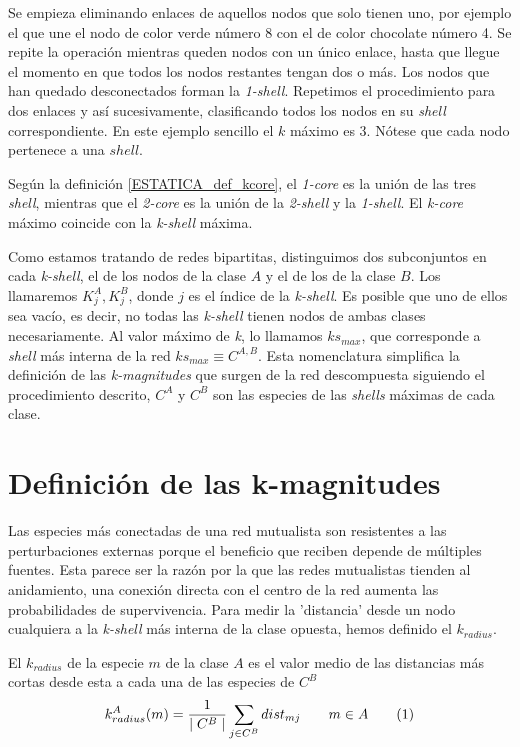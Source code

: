 Se empieza eliminando enlaces de aquellos nodos que solo tienen uno, por ejemplo el que une el nodo de color verde número 8 con el de color chocolate número 4. Se repite la operación mientras queden nodos con un único enlace, hasta que llegue el momento en que todos los nodos restantes tengan dos o más. Los nodos que han quedado desconectados forman la \textit{1-shell}. Repetimos el procedimiento para dos enlaces y así sucesivamente, clasificando todos los nodos en su \textit{shell} correspondiente. En este ejemplo sencillo el $k$ máximo es 3. Nótese que cada nodo pertenece a una $shell$.


Según la definición \ref{ESTATICA_def_kcore}, el  \textit{1-core} es la unión de las tres \textit{shell}, mientras que el \textit{2-core} es la unión de la \textit{2-shell} y la \textit{1-shell}. El \textit{k-core} máximo coincide con la  \textit{k-shell} máxima. 

Como estamos tratando de redes bipartitas, distinguimos dos subconjuntos en cada \textit{k-shell}, el de los nodos de la clase $A$ y el de los de la clase $B$. Los llamaremos $K^{A}_{j}, K^{B}_{j}$, donde  $j$ es el índice de la \textit{k-shell}.
Es posible que uno de ellos sea vacío, es decir, no todas las \textit{k-shell} tienen nodos de ambas clases necesariamente.
Al valor máximo de \textit{k}, lo llamamos $ks_{max}$, que corresponde a \textit{shell} más interna de la red $ks_{max}\equiv C^{A,B}$. Esta nomenclatura simplifica la definición de las \textit{k-magnitudes} que surgen de la red descompuesta siguiendo el procedimiento descrito, $C^A$ y $C^B$ son las especies de las \textit{shells} máximas de cada clase.


\section{Definición de las k-magnitudes}
\label{sec:ESTATICA_defkmagnitudes}

Las especies más conectadas de una red mutualista son resistentes a las perturbaciones externas porque el beneficio que reciben depende de múltiples fuentes. Esta parece ser la razón por la que las redes mutualistas tienden al anidamiento, una conexión directa con el centro de la red aumenta las probabilidades de supervivencia. Para medir la 'distancia' desde un nodo cualquiera a la \textit{k-shell} más interna de la clase opuesta, hemos definido el \textit{$k_{radius}$}.

\begin{theo} 
El \textit{$k_{radius}$} de la especie $m$ de la clase $A$ es el valor medio de las distancias más cortas desde esta a cada una de las especies de $C^B$
\begin{align*}
\displaystyle
k^A_{radius}(m) = \frac{1}{\mid C^{B} \mid}\sum\limits_{j \in C^{B}} dist_{mj}  \qquad   m \in A
\stepcounter{equation}\tag{\theequation}\label{ESTATICA_kradius}
\end{align*}
\end{theo}

